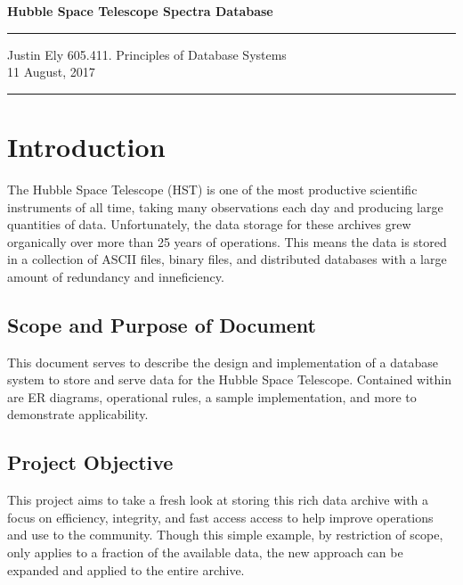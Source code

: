 \documentclass[a4paper,11pt]{article}
\begin{document}
\begin{flushright}

\vspace{1.1cm}

{\bf\Huge Hubble Space Telescope Spectra Database}

\rule{0.25\linewidth}{0.5pt}

\vspace{0.5cm}
Justin Ely
\linebreak
\footnotesize{605.411. Principles of Database Systems \\}
11 August, 2017
\end{flushright}

\noindent\rule{\linewidth}{1.0pt}


\section{Introduction}
The Hubble Space Telescope (HST) is one of the most productive scientific instruments of all time, taking many observations each day and producing large quantities of data.  Unfortunately, the data storage for these archives grew organically over more than 25 years of operations.  This means the data is stored in a collection of ASCII files, binary files, and distributed databases with a large amount of redundancy and inneficiency. 

\subsection{Scope and Purpose of Document}
This document serves to describe the design and implementation of a database system to store and serve data for the Hubble Space Telescope.  Contained within are ER diagrams, operational rules, a sample implementation, and more to demonstrate applicability.  

\subsection{Project Objective}
This project aims to take a fresh look at storing this rich data archive with a focus on efficiency, integrity, and fast access access to help improve operations and use to the community.  Though this simple example, by restriction of scope, only applies to a fraction of the available data, the new approach can be expanded and applied to the entire archive.
\end{document}
